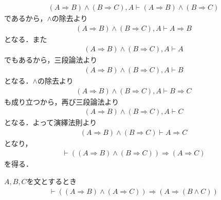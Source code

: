 	\begin{prf}
		\begin{align}
			(A \Longrightarrow B) \wedge (B \Longrightarrow C),A \vdash 
			(A \Longrightarrow B) \wedge (B \Longrightarrow C)
		\end{align}
		であるから，$\wedge$の除去より
		\begin{align}
			(A \Longrightarrow B) \wedge (B \Longrightarrow C),A \vdash A \Longrightarrow B
		\end{align}
		となる．また
		\begin{align}
			(A \Longrightarrow B) \wedge (B \Longrightarrow C),A \vdash A
		\end{align}
		でもあるから，三段論法より
		\begin{align}
			(A \Longrightarrow B) \wedge (B \Longrightarrow C),A \vdash B
		\end{align}
		となる．$\wedge$の除去より
		\begin{align}
			(A \Longrightarrow B) \wedge (B \Longrightarrow C),A \vdash B \Longrightarrow C
		\end{align}
		も成り立つから，再び三段論法より
		\begin{align}
			(A \Longrightarrow B) \wedge (B \Longrightarrow C),A \vdash C
		\end{align}
		となる．よって演繹法則より
		\begin{align}
			(A \Longrightarrow B) \wedge (B \Longrightarrow C) \vdash A \Longrightarrow C
		\end{align}
		となり，
		\begin{align}
			\vdash ((A \Longrightarrow B) \wedge (B \Longrightarrow C)) 
			\Longrightarrow (A \Longrightarrow C)
		\end{align}
		を得る．
		\QED
	\end{prf}
	
	\begin{screen}
		\begin{logicalthm}[二式が同時に導かれるならその論理積が導かれる]
		\label{logicalthm:conjunction_of_consequences}
			$A,B,C$を文とするとき
			\begin{align}
				\vdash ((A \Longrightarrow B) \wedge (A \Longrightarrow C))
				\Longrightarrow (A \Longrightarrow (B \wedge C))
			\end{align}
		\end{logicalthm}
	\end{screen}
	
